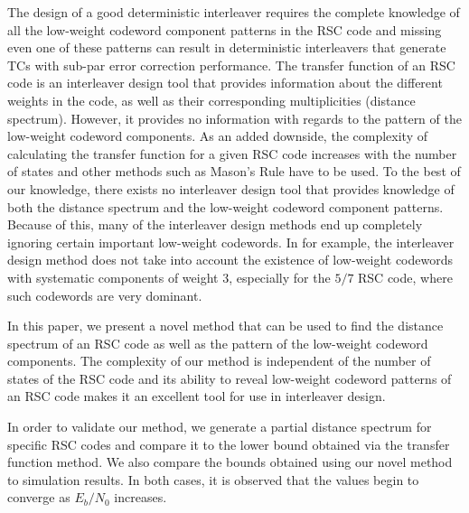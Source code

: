 The design of a good deterministic interleaver requires the complete knowledge of all the low-weight codeword component patterns in the RSC code and missing even one of these patterns can result in deterministic interleavers that generate TCs with sub-par error correction performance.
The transfer function of an RSC code is an interleaver design tool that provides information about the different weights in the code, as well as their corresponding multiplicities (distance spectrum). 
However, it provides no information with regards to the pattern of the low-weight codeword components. As an added downside, the complexity of calculating the transfer function for a given RSC code increases with the number of states and other methods such as Mason's Rule \cite{ref3} have to be used. To the best of our knowledge, there exists no interleaver design tool that provides knowledge of both the distance spectrum and the low-weight codeword component patterns. Because of this, many of the interleaver design methods end up completely ignoring certain important low-weight codewords. In \cite{ref5} for example, the interleaver design method does not take into account the existence of low-weight codewords with systematic components of weight 3, especially for the $5/7$  RSC code, where such codewords are very dominant.

In this paper, we present a novel method that can be used to find the distance spectrum of an RSC code as well as the pattern of the low-weight codeword components. The complexity of our method is independent of the number of states of the RSC code and its ability to reveal low-weight codeword patterns of an RSC code makes it an excellent tool for use in interleaver design.

In order to validate our method, we generate a partial distance spectrum for specific RSC codes and compare it to the lower bound obtained via the transfer function method. We also compare the bounds obtained using our novel method to simulation results. In both cases, it is observed that the values begin to converge as $E_b/N_0$ increases.

